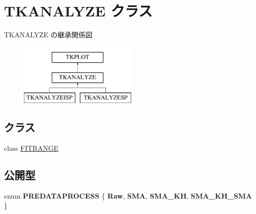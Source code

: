 \hypertarget{class_t_k_a_n_a_l_y_z_e}{}\section{T\+K\+A\+N\+A\+L\+Y\+ZE クラス}
\label{class_t_k_a_n_a_l_y_z_e}
T\+K\+A\+N\+A\+L\+Y\+ZE の継承関係図\begin{figure}[H]
\begin{center}
\leavevmode
\includegraphics[height=3.000000cm]{class_t_k_a_n_a_l_y_z_e}
\end{center}
\end{figure}
\subsection*{クラス}
\begin{DoxyCompactItemize}
\item 
class \hyperlink{class_t_k_a_n_a_l_y_z_e_1_1_f_i_t_r_a_n_g_e}{F\+I\+T\+R\+A\+N\+GE}
\end{DoxyCompactItemize}
\subsection*{公開型}
\begin{DoxyCompactItemize}
\item 
\mbox{\label{class_t_k_a_n_a_l_y_z_e_a7a931f59627879ac86be378797e00e1e}} 
enum {\bfseries P\+R\+E\+D\+A\+T\+A\+P\+R\+O\+C\+E\+SS} \{ {\bfseries Raw}, 
{\bfseries S\+MA}, 
{\bfseries S\+M\+A\+\_\+\+KH}, 
{\bfseries S\+M\+A\+\_\+\+K\+H\+\_\+\+S\+MA}
 \}
\end{DoxyCompactItemize}
